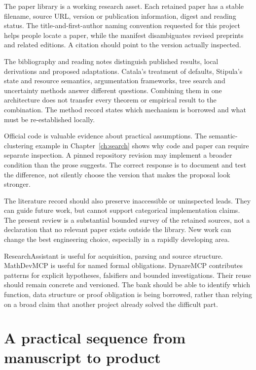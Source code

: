 The paper library is a working research asset. Each retained paper has a stable
filename, source URL, version or publication information, digest and reading
status. The title-and-first-author naming convention requested for this project
helps people locate a paper, while the manifest disambiguates revised preprints
and related editions. A citation should point to the version actually inspected.

The bibliography and reading notes distinguish published results, local
derivations and proposed adaptations. Catala's treatment of defaults, Stipula's
state and resource semantics, argumentation frameworks, tree search and uncertainty
methods answer different questions. Combining them in one architecture does not
transfer every theorem or empirical result to the combination. The method record
states which mechanism is borrowed and what must be re-established locally.

Official code is valuable evidence about practical assumptions. The semantic-
clustering example in Chapter~\ref{ch:search} shows why code and paper can require
separate inspection. A pinned repository revision may implement a broader
condition than the prose suggests. The correct response is to document and test
the difference, not silently choose the version that makes the proposal look
stronger.

The literature record should also preserve inaccessible or uninspected leads.
They can guide future work, but cannot support categorical implementation claims.
The present review is a substantial bounded survey of the retained sources,
not a declaration that no relevant paper exists outside the library. New work can
change the best engineering choice, especially in a rapidly developing area.

ResearchAssistant is useful for acquisition, parsing and source structure.
MathDevMCP is useful for named formal obligations. DynareMCP contributes patterns
for explicit hypotheses, falsifiers and bounded investigations. Their reuse
should remain concrete and versioned. The bank should be able to identify which
function, data structure or proof obligation is being borrowed, rather than
relying on a broad claim that another project already solved the difficult part.

\section{A practical sequence from manuscript to product}

